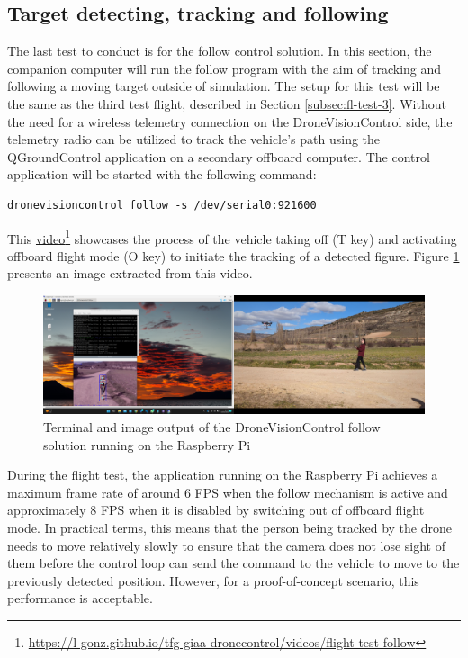 \subsection{Target detecting, tracking and following}
\label{subsec:fl-test-5}

The last test to conduct is for the follow control solution. In this section, the companion computer will run the follow program with the aim of tracking and following a moving target outside of simulation. The setup for this test will be the same as the third test flight, described in Section \ref{subsec:fl-test-3}. Without the need for a wireless telemetry connection on the DroneVisionControl side, the telemetry radio can be utilized to track the vehicle's path using the QGroundControl application on a secondary offboard computer. The control application will be started with the following command:
\begin{verbatim}
dronevisioncontrol follow -s /dev/serial0:921600
\end{verbatim}
This \href{https://l-gonz.github.io/tfg-giaa-dronecontrol/videos/flight-test-follow}{video}\footnote{\url{https://l-gonz.github.io/tfg-giaa-dronecontrol/videos/flight-test-follow}} showcases the process of the vehicle taking off (T key) and activating offboard flight mode (O key) to initiate the tracking of a detected figure. Figure \ref{fig:flight-test-follow} presents an image extracted from this video.


\begin{figure}[H]
  \centering
  \includegraphics[width=\textwidth, keepaspectratio]{img/video-field-test-follow.png}
  \caption{Terminal and image output of the DroneVisionControl follow solution running on the Raspberry Pi}
  \label{fig:flight-test-follow}
\end{figure}


During the flight test, the application running on the Raspberry Pi achieves a maximum frame rate of around 6 FPS when the follow mechanism is active and approximately 8 FPS when it is disabled by switching out of offboard flight mode. In practical terms, this means that the person being tracked by the drone needs to move relatively slowly to ensure that the camera does not lose sight of them before the control loop can send the command to the vehicle to move to the previously detected position. However, for a proof-of-concept scenario, this performance is acceptable.


